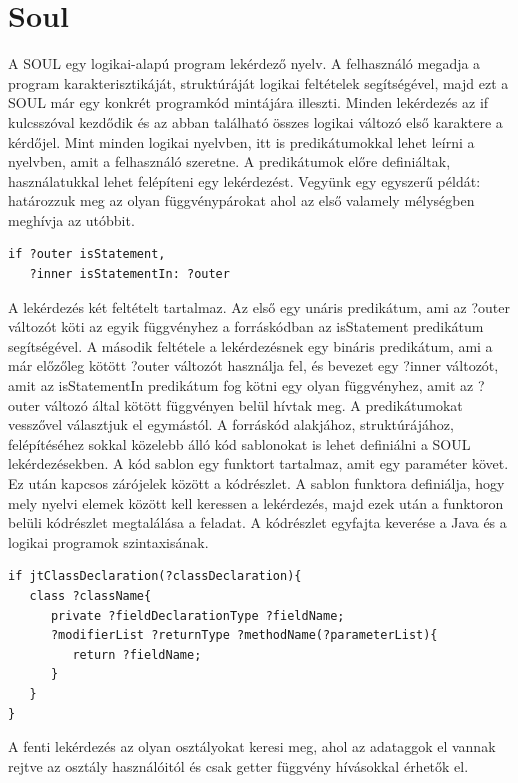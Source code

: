 \documentclass[a4paper,12pt]{report}
\begin{document}
\section{Soul}
\par A SOUL egy logikai-alapú program lekérdező nyelv. A felhasználó megadja a program karakterisztikáját, struktúráját logikai feltételek segítségével, majd ezt a SOUL már egy konkrét programkód mintájára illeszti.
Minden lekérdezés az if kulcsszóval kezdődik és az abban található összes logikai változó első karaktere a kérdőjel. Mint minden logikai nyelvben, itt is predikátumokkal lehet leírni a nyelvben, amit a felhasználó szeretne. A predikátumok előre definiáltak, használatukkal lehet felépíteni egy lekérdezést. Vegyünk egy egyszerű példát: határozzuk meg az olyan függvénypárokat ahol az első valamely mélységben meghívja az utóbbit.
\begin{verbatim}
if ?outer isStatement, 
   ?inner isStatementIn: ?outer
\end{verbatim}
\par A lekérdezés két feltételt tartalmaz. Az első egy unáris predikátum, ami az ?outer változót köti az egyik függvényhez a forráskódban az isStatement predikátum segítségével. A második feltétele a lekérdezésnek egy bináris predikátum, ami a már előzőleg kötött ?outer változót használja fel, és bevezet egy ?inner változót, amit az isStatementIn predikátum fog kötni egy olyan függvényhez, amit az ?outer változó által kötött függvényen belül hívtak meg. A predikátumokat vesszővel választjuk el egymástól. A forráskód alakjához, struktúrájához, felépítéséhez sokkal közelebb álló kód sablonokat is lehet definiálni a SOUL lekérdezésekben. A kód sablon egy funktort tartalmaz, amit egy paraméter követ. Ez után kapcsos zárójelek között a kódrészlet. A sablon funktora definiálja, hogy mely nyelvi elemek között kell keressen a lekérdezés, majd ezek után a funktoron belüli kódrészlet megtalálása a feladat. A kódrészlet egyfajta keverése a Java és a logikai programok szintaxisának.
\begin{verbatim}
if jtClassDeclaration(?classDeclaration){
   class ?className{
      private ?fieldDeclarationType ?fieldName;
      ?modifierList ?returnType ?methodName(?parameterList){
         return ?fieldName;
      }
   }
}
\end{verbatim}
A fenti lekérdezés az olyan osztályokat keresi meg, ahol az adataggok el vannak rejtve az osztály használóitól és csak getter függvény hívásokkal érhetők el.
\end{document}
